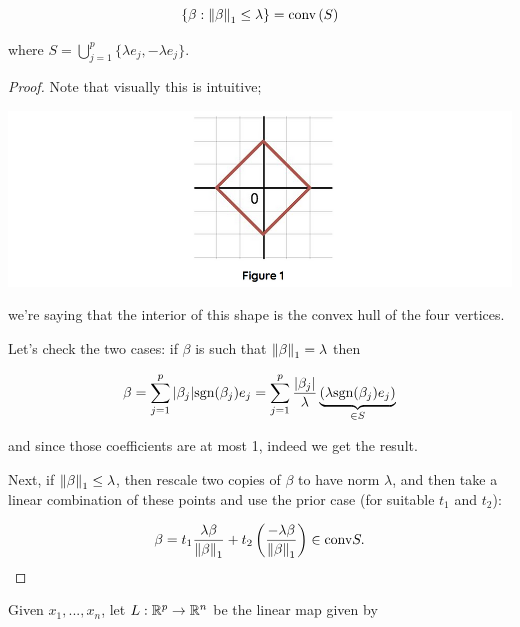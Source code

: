 \documentclass[11pt]{scrartcl}
\begin{document}
\begin{theorem}
\begin{equation}
    \{ \beta : \left\lVert\beta\right\rVert_1 \le \lambda \} = \text{conv} \left( S \right)
\end{equation}

where $S = \bigcup_{j=1}^p \{ \lambda e_j , - \lambda e_j  \}$.

\begin{proof}

Note that visually this is intuitive; 
\begin{center}
\includegraphics[scale=0.25]{tax2.png}
\label{surrogates picture}
\end{center}

we're saying that the interior of this shape is the convex hull of the four vertices.

Let's check the two cases: if $\beta$ is such that $\left\lVert\beta\right\rVert_1 = \lambda$ then 

\begin{equation}
    \beta = \sum_{j=1}^p |\beta_j| \text{sgn} (\beta_j) e_j = \sum_{j=1}^p \frac{|\beta_j|}{\lambda} \underbrace{( \lambda \text{sgn} (\beta_j) e_j )}_{\in S}
\end{equation}

and since those coefficients are at most 1, indeed we get the result.

Next, if $\left\lVert\beta\right\rVert_1 \le \lambda$, then rescale two copies of $\beta$ to have norm $\lambda$, and then take a linear combination of these points and use the prior case (for suitable $t_1$ and $t_2$):

\begin{equation}
    \beta = t_1 \frac{\lambda \beta}{ \left\lVert\beta\right\rVert_1} + t_2 \left( \frac{-\lambda \beta}{\left\lVert\beta\right\rVert_1} \right) \in \text{conv} S.
\end{equation}
\end{proof}
\end{theorem}

Given $x_1, ... , x_n$, let $L:\mathbb R^p \rightarrow \mathbb R^n$ be the linear map given by
\end{document}
